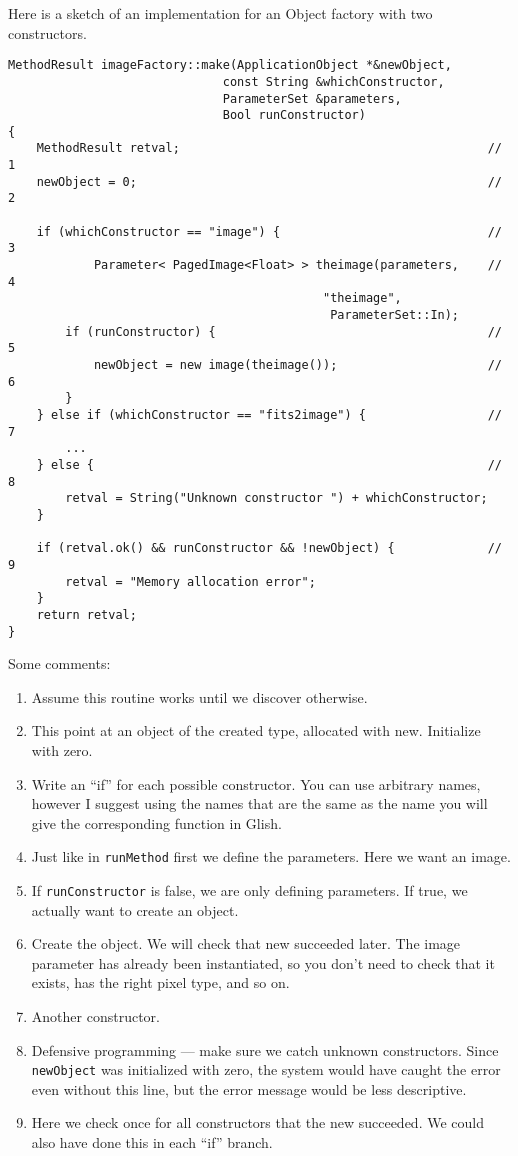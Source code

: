 Here is a sketch of an implementation for an Object factory with two
constructors.

\begin{verbatim}
MethodResult imageFactory::make(ApplicationObject *&newObject,
                              const String &whichConstructor,
                              ParameterSet &parameters,
                              Bool runConstructor)
{
    MethodResult retval;                                           //  1
    newObject = 0;                                                 //  2
    
    if (whichConstructor == "image") {                             //  3
            Parameter< PagedImage<Float> > theimage(parameters,    //  4
                                            "theimage",
                                             ParameterSet::In);
        if (runConstructor) {                                      //  5
            newObject = new image(theimage());                     //  6
        }
    } else if (whichConstructor == "fits2image") {                 //  7
        ...
    } else {                                                       //  8
        retval = String("Unknown constructor ") + whichConstructor;
    }

    if (retval.ok() && runConstructor && !newObject) {             //  9
        retval = "Memory allocation error";
    }
    return retval;
}
\end{verbatim}

Some comments:
\begin{enumerate}
  \item Assume this routine works until we discover otherwise.
  \item This point at an object of the created type, allocated with
        new. Initialize with zero.
  \item Write an ``if'' for each possible constructor. You can use
        arbitrary names, however I suggest using the names that are
        the same as the name you will give the corresponding function
        in Glish.
  \item Just like in {\tt runMethod} first we define the parameters.
        Here we want an image.
  \item If {\tt runConstructor} is false, we are only defining parameters.
        If true, we actually want to create an object.
  \item Create the object. We will check that new succeeded later.
        The image parameter has already been instantiated, so you don't need
        to check that it exists, has the right pixel type, and so on.
  \item Another constructor.
  \item Defensive programming --- make sure we catch unknown constructors.
        Since {\tt newObject} was initialized with zero, the system would
        have caught the error even without this line, but the error message
        would be less descriptive.
  \item Here we check once for all constructors that the new
        succeeded. We could also have done this in each ``if'' branch.
\end{enumerate}

